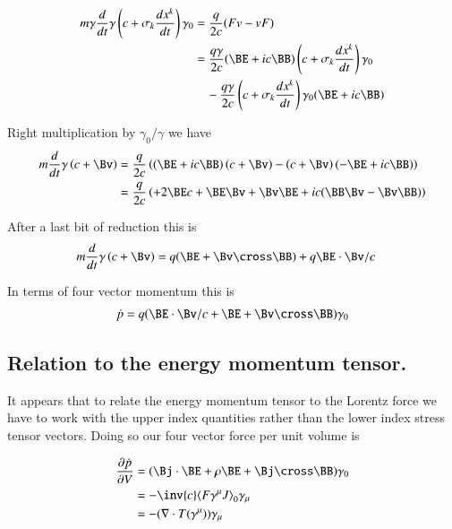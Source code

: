 \documentclass{article}
\begin{document}
\begin{align*}
m \gamma \frac{d}{dt} \gamma \left(c + \sigma_k \frac{dx^k}{dt}\right) \gamma_0
&= \frac{q}{2c}(F v - v F) \\
&=
\frac{q \gamma}{2c} 
(\BE + i c\BB) 
\left(c + \sigma_k \frac{dx^k}{dt}\right) \gamma_0
\\
&\quad -
\frac{q \gamma}{2c} 
\left(c + \sigma_k \frac{dx^k}{dt}\right) \gamma_0
(\BE + i c\BB) \\
\end{align*}

Right multiplication by $\gamma_0/\gamma$ we have
\begin{align*}
m \frac{d}{dt} \gamma \left(c + \Bv \right) 
&= \frac{q }{2c} \left( (\BE + i c\BB) \left(c + \Bv \right) -\left(c + \Bv \right) (-\BE + i c\BB) \right) \\
&= \frac{q }{2c} \left( 
+ 2 \BE c 
+ \BE \Bv  + \Bv \BE 
+ i c (\BB \Bv  - \Bv \BB)
\right) \\
\end{align*}

After a last bit of reduction this is
\begin{align}
m \frac{d}{dt} \gamma \left(c + \Bv \right) &= q (\BE + \Bv \cross \BB) + q \BE \cdot \Bv/c
\end{align}

In terms of four vector momentum this is
\begin{align}\label{eqn:lorentzForceVec}
\dot{p} = q ( \BE \cdot \Bv/c + \BE + \Bv \cross \BB ) \gamma_0
\end{align}

\subsection{ Relation to the energy momentum tensor. }

It appears that to relate the energy momentum tensor to the Lorentz force we have 
to work with the upper index quantities rather than the lower index stress tensor vectors.  Doing so
our four vector force per unit volume is
 
\begin{align}
\PD{V}{\dot{p}}
&= (\Bj \cdot \BE + \rho \BE + \Bj \cross \BB) \gamma_0 \\
&= - \inv{c} \gpgradezero{ F \gamma^\mu J } \gamma_\mu \\
&= - (\grad \cdot T(\gamma^\mu)) \gamma_\mu
\end{align}
\end{document}
